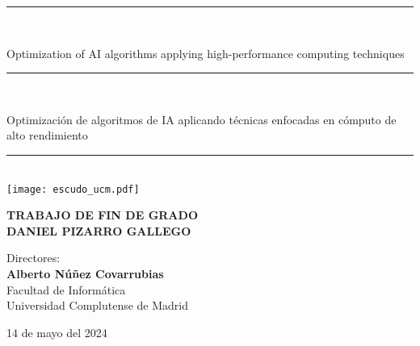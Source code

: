 \begin{titlepage}
	\thispagestyle{empty}

	\begin{center}

		\vspace{1cm}

		\vspace{0.65cm}
		\rule{2in}{0.5pt}\\
		\vspace{0.85cm}

		{\Large Optimization of AI algorithms applying high-performance computing techniques}\\

		\vspace{0.65cm}
		\rule{2in}{0.5pt}\\
		\vspace{0.85cm}

		{\Large Optimización de algoritmos de IA aplicando técnicas enfocadas en cómputo de alto rendimiento}\\

		\vspace{0.65cm}
		\rule{2in}{0.5pt}\\



		\vfill
		\texttt{[image: escudo\_ucm.pdf]}
		\vfill

		

		\textbf{TRABAJO DE FIN DE GRADO}\\
		\vspace{0.7cm}
		\textbf{DANIEL PIZARRO GALLEGO}

		\vspace{1cm}

		Directores:\\
		\textbf{Alberto Núñez Covarrubias}\\

		\vspace{1.8cm}
		Facultad de Informática\\
		Universidad Complutense de Madrid
		\vspace{0.5cm}
	   
		14 de mayo del 2024

		\vspace{0.2cm}

	\end{center}
\end{titlepage}